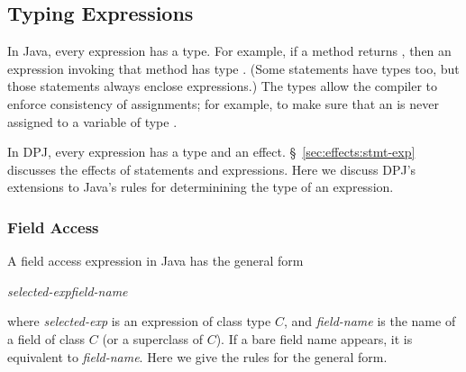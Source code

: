 \subsection{Typing Expressions%
\label{sec:types:exp}}

In Java, every expression has a type.  For example, if a method
returns , then an expression invoking that method has type
.  (Some statements have types too, but those statements
always enclose expressions.)  The types allow the compiler to enforce
consistency of assignments; for example, to make sure that an
 is never assigned to a variable of type .

In DPJ, every expression has a type and an effect.
\S~\ref{sec:effects:stmt-exp} discusses the effects of statements and
expressions.  Here we discuss DPJ's extensions to Java's rules for
determinining the type of an expression.

\subsubsection{Field Access%
\label{sec:types:exp:field}}

A field access expression in Java has the general form
%
\begin{description}
\item \emph{selected-exp}\emph{field-name}
\end{description}
%
where \emph{selected-exp} is an expression of class type $C$, and
\emph{field-name} is the name of a field of class $C$ (or a superclass
of $C$).  If a bare field name appears, it is equivalent to
\emph{field-name}.  Here we give the rules for the general
form.

